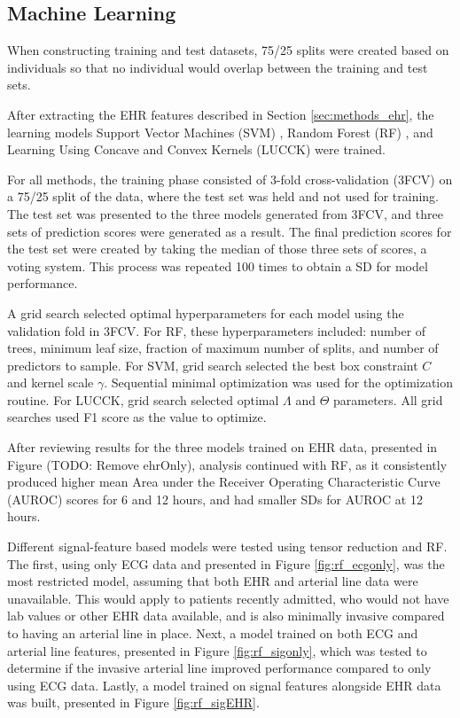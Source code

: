 \subsection{Machine Learning} \label{sec:methods_ml}
When constructing training and test datasets, 75/25 splits were created based on individuals so that no individual would overlap between the training and test sets.

After extracting the EHR features described in Section \ref{sec:methods_ehr}, the learning models Support Vector Machines (SVM) \cite{cortes_support-vector_1995}, Random Forest (RF) \cite{breiman_random_2001}, and Learning Using Concave and Convex Kernels (LUCCK) \cite{sabeti_learning_2019} were trained.

For all methods, the training phase consisted of 3-fold cross-validation (3FCV) on a 75/25 split of the data, where the test set was held and not used for training. The test set was presented to the three models generated from 3FCV, and three sets of prediction scores were generated as a result. The final prediction scores for the test set were created by taking the median of those three sets of scores, a voting system. This process was repeated 100 times to obtain a SD for model performance. 

A grid search selected optimal hyperparameters for each model using the validation fold in 3FCV. For RF, these hyperparameters included: number of trees, minimum leaf size, fraction of maximum number of splits, and number of predictors to sample. For SVM, grid search selected the best box constraint $C$ and kernel scale $\gamma$. Sequential minimal optimization \cite{JMLR:v6:fan05a} was used for the optimization routine. For LUCCK, grid search selected optimal $\Lambda$ and $\Theta$ parameters. All grid searches used F1 score as the value to optimize. 

After reviewing results for the three models trained on EHR data, presented in Figure (TODO: Remove ehrOnly), analysis continued with RF, as it consistently produced higher mean Area under the Receiver Operating Characteristic Curve (AUROC) scores for 6 and 12 hours, and had smaller SDs for AUROC at 12 hours. 

Different signal-feature based models were tested using tensor reduction and RF. The first, using only ECG data and presented in Figure \ref{fig:rf_ecgonly}, was the most restricted model, assuming that both EHR and arterial line data were unavailable. This would apply to patients recently admitted, who would not have lab values or other EHR data available, and is also minimally invasive compared to having an arterial line in place. Next, a model trained on both ECG and arterial line features, presented in Figure \ref{fig:rf_sigonly}, which was tested to determine if the invasive arterial line improved performance compared to only using ECG data. Lastly, a model trained on signal features alongside EHR data was built, presented in Figure \ref{fig:rf_sigEHR}.
